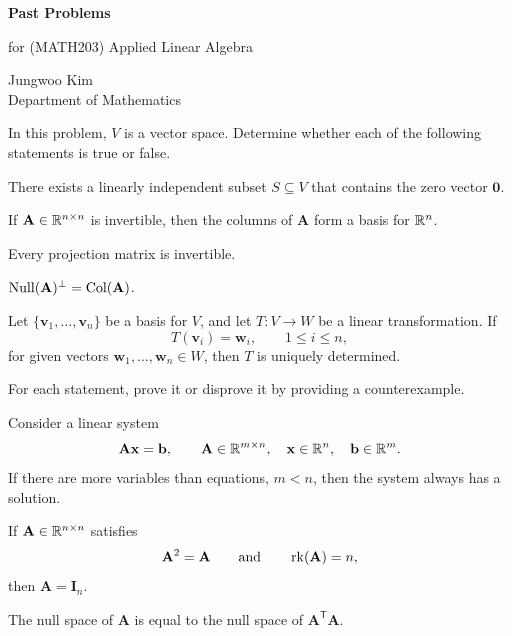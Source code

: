 \documentclass[11pt,oneside]{article}
\begin{document}
\thispagestyle{empty}

\begin{center}
    \vspace*{1.1cm}
    {\LARGE\bfseries Past Problems\par}
    \vspace{0.25cm}
    {\large for (MATH203) Applied Linear Algebra\par}
    \vspace{0.75cm}
    {\normalsize
    Jungwoo Kim\\
    Department of Mathematics\\
    \PohangUniversityOfScienceAndTechnology
    \par}
\end{center}

\vspace{0.8cm}

\schoolsection{\POSTECH}{\PohangUniversityOfScienceAndTechnology}

\begin{problem}
In this problem, $V$ is a vector space. Determine whether each of the following statements is true or false.
\begin{problemchoices}
\item There exists a linearly independent subset $S\subseteq V$ that contains the zero vector $\mathbf 0$.
\item If $\mathbf A\in\mathbb{R}^{n\times n}$ is invertible, then the columns of $\mathbf A$ form a basis for $\mathbb{R}^n$.
\item Every projection matrix is invertible.
\item $\operatorname{Null}(\mathbf A)^\perp=\operatorname{Col}(\mathbf A)$.
\item Let $\{\mathbf v_1,\dots,\mathbf v_n\}$ be a basis for $V$, and let $T\colon V\to W$ be a linear transformation. If
\[
T(\mathbf v_i)=\mathbf w_i,
\qquad 1\le i\le n,
\]
for given vectors $\mathbf w_1,\dots,\mathbf w_n\in W$, then $T$ is uniquely determined.
\end{problemchoices}
\end{problem}

\begin{problem}
For each statement, prove it or disprove it by providing a counterexample.
\begin{problemchoices}
\item Consider a linear system
\[
\mathbf A\mathbf x=\mathbf b,
\qquad
\mathbf A\in\mathbb{R}^{m\times n},\quad
\mathbf x\in\mathbb{R}^n,\quad
\mathbf b\in\mathbb{R}^m.
\]
If there are more variables than equations, $m<n$, then the system always has a solution.
\item If $\mathbf A\in\mathbb{R}^{n\times n}$ satisfies
\[
\mathbf A^2=\mathbf A
\qquad\text{and}\qquad
\operatorname{rk}(\mathbf A)=n,
\]
then $\mathbf A=\mathbf I_n$.
\item The null space of $\mathbf A$ is equal to the null space of $\mathbf A^{\mathsf T}\mathbf A$.
\end{problemchoices}
\end{problem}
\end{document}
